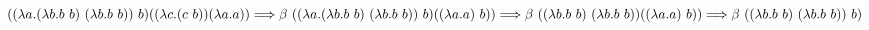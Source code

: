 \documentclass[12pt]{article}
\begin{document}
$((\lambda a.(\lambda b.b\ b)\ (\lambda b.b\ b))\ b)((\lambda c.(c\ b))(\lambda a.a)) 
\Longrightarrow \beta\ ((\lambda a.(\lambda b.b\ b)\ (\lambda b.b\ b))\ b)((\lambda a.a)\ b))\\
\Longrightarrow \beta\ ((\lambda b.b\ b)\ (\lambda b.b\ b))((\lambda a.a)\ b))
\Longrightarrow \beta\ ((\lambda b.b\ b)\ (\lambda b.b\ b))\ b)
$
\end{document}
